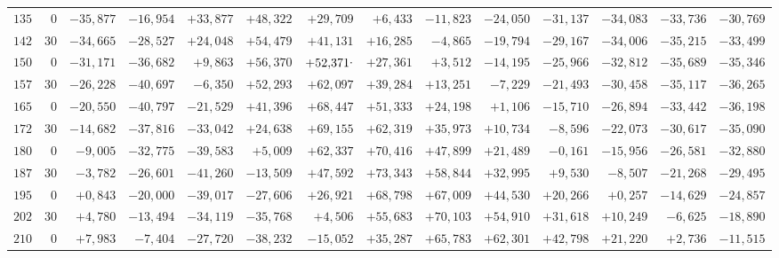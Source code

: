 \begin{landscape}
\begin{longtable}{@{}rr|r|r|r|r|r|r|r|r|r|r|r|r@{}}
\(135\) & \(0\) & \(-35{,}877\) & \(-16{,}954\) & \(+33{,}877\) & \(+48{,}322\) & \(+29{,}709\) & \(+6{,}433\) & \(-11{,}823\) & \(-24{,}050\) & \(-31{,}137\) & \(-34{,}083\) & \(-33{,}736\) & \(-30{,}769\)\\
\(142\) & \(30\) & \(-34{,}665\) & \(-28{,}527\) & \(+24{,}048\) & \(+54{,}479\) & \(+41{,}131\) & \(+16{,}285\) & \(-4{,}865\) & \(-19{,}794\) & \(-29{,}167\) & \(-34{,}006\) & \(-35{,}215\) & \(-33{,}499\)\\[2pt]
\(150\) & \(0\) & \(-31{,}171\) & \(-36{,}682\) & \(+9{,}863\) & \(+56{,}370\) & \(+52{,}371\mathord{\raisebox{0.6ex}{.}}\) & \(+27{,}361\) & \(+3{,}512\) & \(-14{,}195\) & \(-25{,}966\) & \(-32{,}812\) & \(-35{,}689\) & \(-35{,}346\)\\
\(157\) & \(30\) & \(-26{,}228\) & \(-40{,}697\) & \(-6{,}350\) & \(+52{,}293\) & \(+62{,}097\) & \(+39{,}284\) & \(+13{,}251\) & \(-7{,}229\) & \(-21{,}493\) & \(-30{,}458\) & \(-35{,}117\) & \(-36{,}265\)\\
\(165\) & \(0\) & \(-20{,}550\) & \(-40{,}797\) & \(-21{,}529\) & \(+41{,}396\) & \(+68{,}447\) & \(+51{,}333\) & \(+24{,}198\) & \(+1{,}106\) & \(-15{,}710\) & \(-26{,}894\) & \(-33{,}442\) & \(-36{,}198\)\\
\(172\) & \(30\) & \(-14{,}682\) & \(-37{,}816\) & \(-33{,}042\) & \(+24{,}638\) & \(+69{,}155\) & \(+62{,}319\) & \(+35{,}973\) & \(+10{,}734\) & \(-8{,}596\) & \(-22{,}073\) & \(-30{,}617\) & \(-35{,}090\)\\[2pt]
\(180\) & \(0\) & \(-9{,}005\) & \(-32{,}775\) & \(-39{,}583\) & \(+5{,}009\) & \(+62{,}337\) & \(+70{,}416\) & \(+47{,}899\) & \(+21{,}489\) & \(-0{,}161\) & \(-15{,}956\) & \(-26{,}581\) & \(-32{,}880\)\\
\(187\) & \(30\) & \(-3{,}782\) & \(-26{,}601\) & \(-41{,}260\) & \(-13{,}509\) & \(+47{,}592\) & \(+73{,}343\) & \(+58{,}844\) & \(+32{,}995\) & \(+9{,}530\) & \(-8{,}507\) & \(-21{,}268\) & \(-29{,}495\)\\
\(195\) & \(0\) & \(+0{,}843\) & \(-20{,}000\) & \(-39{,}017\) & \(-27{,}606\) & \(+26{,}921\) & \(+68{,}798\) & \(+67{,}009\) & \(+44{,}530\) & \(+20{,}266\) & \(+0{,}257\) & \(-14{,}629\) & \(-24{,}857\)\\
\(202\) & \(30\) & \(+4{,}780\) & \(-13{,}494\) & \(-34{,}119\) & \(-35{,}768\) & \(+4{,}506\) & \(+55{,}683\) & \(+70{,}103\) & \(+54{,}910\) & \(+31{,}618\) & \(+10{,}249\) & \(-6{,}625\) & \(-18{,}890\)\\[2pt]
\(210\) & \(0\) & \(+7{,}983\) & \(-7{,}404\) & \(-27{,}720\) & \(-38{,}232\) & \(-15{,}052\) & \(+35{,}287\) & \(+65{,}783\) & \(+62{,}301\) & \(+42{,}798\) & \(+21{,}220\) & \(+2{,}736\) & \(-11{,}515\)\\

\end{longtable}
\end{landscape}
